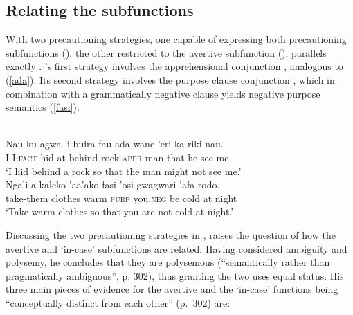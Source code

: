 \documentclass[output=paper,colorlinks,citecolor=brown]{langscibook}
\begin{document}
\subsection{Relating the subfunctions} \label{sec:relating}

With two precautioning strategies, one capable of expressing both precautioning subfunctions (\sane), the other restricted to the avertive subfunction (),  parallels  exactly \citep{lichtenberk1995apprehensional}. 's first strategy involves the apprehensional conjunction , analogous to  (\ref{ada}). Its second strategy involves the purpose clause conjunction , which in combination with a grammatically negative clause yields negative purpose semantics (\ref{fasi}).

\newpage
\begin{exe}
    \ex \label{ada}
     \\
    \gll Nau ku agwa 'i buira  fau  ada {\ob}wane 'eri ka riki nau.{\cb} \\
         I  I:\textsc{fact}      hid  at behind rock \textsc{appr} man that he see me \\
    \glt `I hid behind a rock so that the man might not see me.'
    \ex \label{fasi}
     \\
    \gll Ngali-a kaleko 'aa'ako {\ob}fasi 'osi gwagwari 'afa rodo.{\cb} \\
         take-them   clothes warm \textsc{purp} you.\textsc{neg} {be cold} at night \\
    \glt `Take warm clothes so that you are not cold at night.'
\end{exe}
    
Discussing the two precautioning strategies in , \citet{lichtenberk1995apprehensional} raises the question of how the avertive and `in-case' subfunctions are related. Having considered ambiguity and polysemy, he concludes that they are polysemous (``semantically rather than pragmatically ambiguous'', p. 302), thus granting the two uses equal status. His three main pieces of evidence for the avertive and the `in-case' functions being ``conceptually distinct from each other'' (p.~302) are: %
\end{document}
